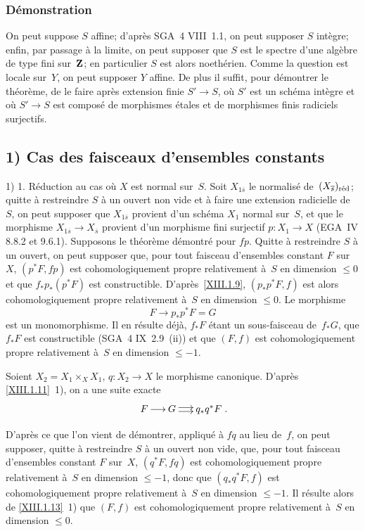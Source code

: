 \subsubsection*{D\'emonstration}
On peut suppose $S$ affine; d'apr\`es SGA~4 VIII~1.1, on peut
supposer $S$ int\`egre; enfin, par passage \`a la limite, on peut
supposer que $S$ est le spectre d'une alg\`ebre de type fini sur~$\mathbf{Z}$; en particulier $S$ est alors noeth\'erien. Comme la question
est locale sur~$Y$, on peut supposer $Y$ affine. De plus il suffit,
pour d\'emontrer le th\'eor\`eme, de le faire apr\`es
extension finie $S'\to S$, o\`u $S'$ est un sch\'ema int\`egre
et o\`u $S'\to S$ est compos\'e de morphismes \'etales et de
morphismes finis radiciels surjectifs.

\subsection*{1) Cas des faisceaux d'ensembles constants}

1) 1. R\'eduction au cas o\`u $X$ est normal sur~$S$. Soit
$X_{1\overline{s}}$ le normalis\'e de~$(X_{\overline{s}})_{\mathrm{r\acute{e}d}}$;
quitte \`a restreindre $S$ \`a un ouvert non vide et \`a faire
une extension radicielle de~$S$, on peut supposer que
$X_{1\overline{s}}$ provient d'un sch\'ema $X_1$ normal sur~$S$, et
que le morphisme $X_{1\overline{s}}\to X_{\overline{s}}$ provient d'un
morphisme fini surjectif $p\colon X_1\to X$ (EGA~IV 8.8.2 et
9.6.1). Supposons le th\'eor\`eme d\'emontr\'e pour
$fp$. Quitte \`a restreindre $S$ \`a un ouvert, on peut supposer
que, pour tout faisceau d'ensembles constant $F$ sur~$X$, $(p^*F,fp)$
est cohomologiquement propre relativement \`a~$S$ en dimension $\le
0$ et que $f_*p_*(p^*F)$ est
constructible. D'apr\`es~\ref{XIII.1.9}, $(p_*p^*F,f)$ est alors
cohomologiquement propre relativement \`a~$S$ en dimension $\le
0$. Le morphisme
$$
F \to p_* p^* F=G
$$
est un monomorphisme. Il en r\'esulte d\'ej\`a, $f_*F$ \'etant
un sous-faisceau de~$f_*G$, que $f_*F$ est constructible (SGA~4
IX~2.9~(ii)) et que $(F,f)$ est cohomologiquement propre relativement
\`a~$S$ en dimension $\le -1$.

Soient $X_2=X_1 \times_{X} X_1$, $q \colon X_2 \to X$ le morphisme
canonique. D'apr\`es \ref{XIII.1.11}~1),
on a une suite exacte
$$
\xymatrix@C=.5cm{{F}\ar[r]&{G}\ar@<2pt>[r]\ar@<-2pt>[r]&{q_*q^*F}}.
$$

D'apr\`es ce que l'on vient de d\'emontrer, appliqu\'e \`a
$fq$ au lieu de~$f$, on peut supposer, quitte \`a restreindre $S$
\`a un ouvert non vide, que, pour tout faisceau d'ensembles constant
$F$ sur~$X$, $(q^*F,fq)$ est cohomologiquement propre relativement
\`a~$S$ en dimension $\le -1$, donc que $(q_*q^*F,f)$ est
cohomologiquement propre relativement \`a~$S$ en dimension $\le
-1$. Il r\'esulte alors de \ref{XIII.1.13}~1) que $(F,f)$ est
cohomologiquement propre relativement \`a~$S$ en dimension $\le 0$.

